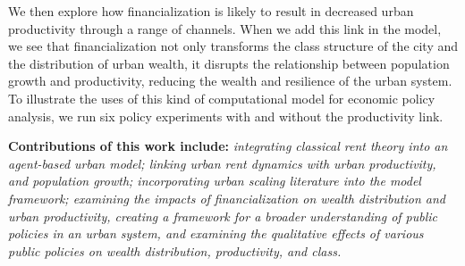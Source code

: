 We then explore how financialization is likely to result in decreased urban productivity through a range of channels. When we add this link in the model, we see that financialization not only transforms the class structure of the city and the distribution of urban wealth, it disrupts the relationship between population growth and productivity, reducing the wealth and resilience of the urban system. To illustrate the uses of this kind of computational model for economic policy analysis, we run six policy experiments with and without the productivity link.  

\textbf{Contributions of this work include:} \textit{integrating classical rent theory into an agent-based urban model; linking urban rent dynamics with urban productivity, and population growth; incorporating urban scaling literature into the model framework; examining the impacts of financialization on wealth distribution and urban productivity, creating a framework for a broader understanding of public policies in an urban system, and examining the qualitative effects of various public policies on wealth distribution, productivity, and class.}


